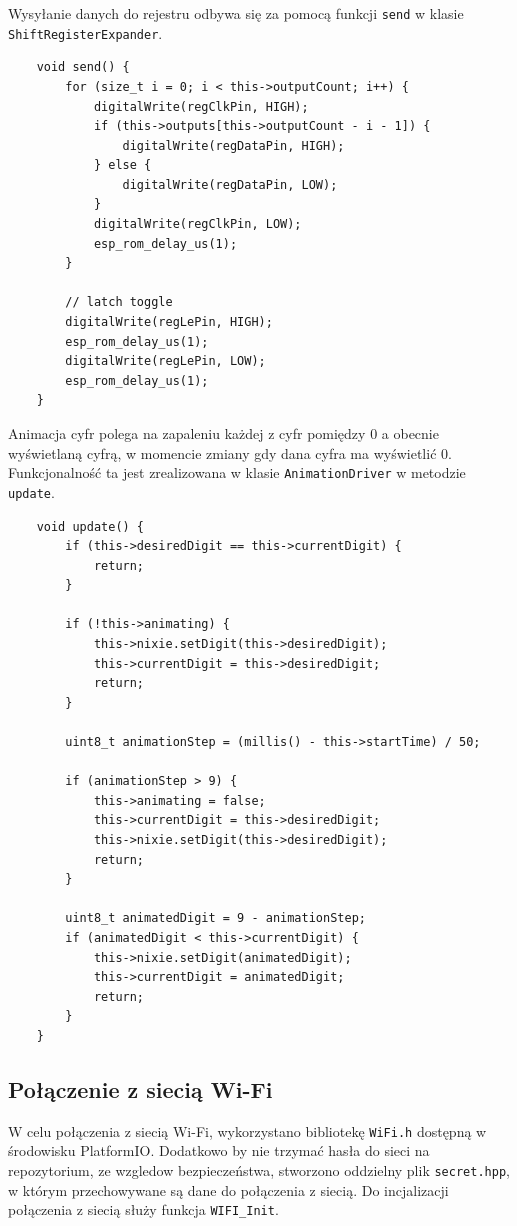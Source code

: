 \documentclass[../main.tex]{subfiles}
\begin{document}
Wysyłanie danych do rejestru odbywa się za pomocą funkcji \texttt{send} w klasie \texttt{ShiftRegisterExpander}.

\begin{verbatim}
    void send() {
        for (size_t i = 0; i < this->outputCount; i++) {
            digitalWrite(regClkPin, HIGH);
            if (this->outputs[this->outputCount - i - 1]) {
                digitalWrite(regDataPin, HIGH);
            } else {
                digitalWrite(regDataPin, LOW);
            }
            digitalWrite(regClkPin, LOW);
            esp_rom_delay_us(1);
        }

        // latch toggle
        digitalWrite(regLePin, HIGH);
        esp_rom_delay_us(1);
        digitalWrite(regLePin, LOW);
        esp_rom_delay_us(1);
    }
\end{verbatim}


Animacja cyfr polega na zapaleniu każdej z cyfr pomiędzy 0 a obecnie wyświetlaną cyfrą, w momencie zmiany gdy dana cyfra ma wyświetlić 0.
Funkcjonalność ta jest zrealizowana w klasie \texttt{AnimationDriver} w metodzie \texttt{update}.

\begin{verbatim}
    void update() {
        if (this->desiredDigit == this->currentDigit) {
            return;
        }

        if (!this->animating) {
            this->nixie.setDigit(this->desiredDigit);
            this->currentDigit = this->desiredDigit;
            return;
        }

        uint8_t animationStep = (millis() - this->startTime) / 50;

        if (animationStep > 9) {
            this->animating = false;
            this->currentDigit = this->desiredDigit;
            this->nixie.setDigit(this->desiredDigit);
            return;
        }

        uint8_t animatedDigit = 9 - animationStep;
        if (animatedDigit < this->currentDigit) {
            this->nixie.setDigit(animatedDigit);
            this->currentDigit = animatedDigit;
            return;
        }
    }
\end{verbatim}

\subsection{Połączenie z siecią Wi-Fi}
W celu połączenia z siecią Wi-Fi, wykorzystano bibliotekę \texttt{WiFi.h} dostępną w środowisku PlatformIO. Dodatkowo by nie trzymać hasła do sieci na repozytorium, ze wzgledow bezpieczeństwa,
stworzono oddzielny plik \texttt{secret.hpp}, w którym przechowywane są dane do połączenia z siecią. Do incjalizacji połączenia z siecią służy funkcja \texttt{WIFI\_Init}.
\end{document}
